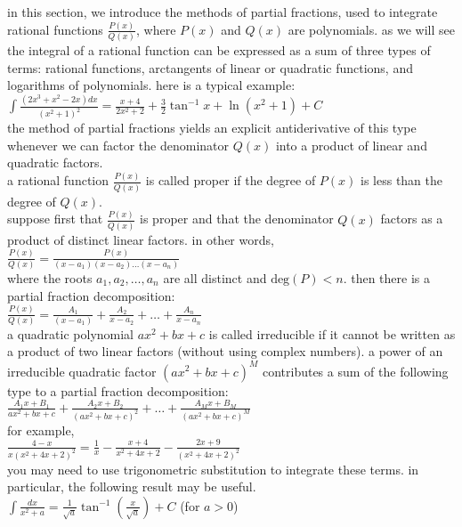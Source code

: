 \documentclass{article}
\begin{document}
in this section, we introduce the methods of partial fractions, used to integrate rational functions $\frac{P(x)}{Q(x)}$, where $P(x)$ and $Q(x)$ are polynomials. as we will see the integral of a rational function can be expressed as a sum of three types of terms: rational functions, arctangents of linear or quadratic functions, and logarithms of polynomials. here is a typical example:\\ $\int\frac{(2x^3 + x^2 - 2x)dx}{(x^2 + 1)^2} = \frac{x + 4}{2x^2 + 2} + \frac{3}{2}\tan^{-1}x + \ln(x^2 + 1) + C$\\ the method of partial fractions yields an explicit antiderivative of this type whenever we can factor the denominator $Q(x)$ into a product of linear and quadratic factors.\\ a rational function $\frac{P(x)}{Q(x)}$ is called proper if the degree of $P(x)$ is less than the degree of $Q(x)$.\\ suppose first that $\frac{P(x)}{Q(x)}$ is proper and that the denominator $Q(x)$ factors as a product of distinct linear factors. in other words,\\
$\frac{P(x)}{Q(x)} = \frac{P(x)}{(x - a_1)(x - a_2)\ldots(x - a_n)}$\\
where the roots $a_1, a_2, \ldots, a_n$ are all distinct and $\text{deg}(P) < n$. then there is a partial fraction decomposition:\\ 
$\frac{P(x)}{Q(x)} = \frac{A_1}{(x - a_1)} + \frac{A_2}{x - a_2} + \ldots + \frac{A_n}{x - a_n}$\\

a quadratic polynomial $ax^2 + bx + c$ is called irreducible if it cannot be written as a product of two linear factors (without using complex numbers). a power of an irreducible quadratic factor $(ax^2 + bx + c)^M$ contributes a sum of the following type to a partial fraction decomposition:\\
$\frac{A_1x + B_1}{ax^2 + bx + c} + \frac{A_2x + B_2}{(ax^2 + bx + c)^2} + \ldots + \frac{A_Mx + B_M}{(ax^2 + bx + c)^M}$\\
for example,\\
$\frac{4 - x}{x(x^2 + 4x + 2)^2} = \frac{1}{x} - \frac{x + 4}{x^2 + 4x + 2} - \frac{2x + 9}{(x^2 + 4x + 2)^2}$\\
you may need to use trigonometric substitution to integrate these terms. in particular, the following result may be useful.\\
$\int\frac{dx}{x^2 + a} = \frac{1}{\sqrt{a}}\tan^{-1}(\frac{x}{\sqrt{a}}) + C$ (for $a > 0$)\\
\end{document}

